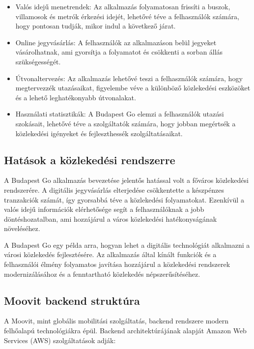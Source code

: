 \begin{itemize} \item Valós idejű menetrendek: Az alkalmazás folyamatosan frissíti a buszok, villamosok és metrók érkezési idejét, lehetővé téve a felhasználók számára, hogy pontosan tudják, mikor indul a következő járat. \item Online jegyvásárlás: A felhasználók az alkalmazáson belül jegyeket vásárolhatnak, ami gyorsítja a folyamatot és csökkenti a sorban állás szükségességét. \item Útvonaltervezés: Az alkalmazás lehetővé teszi a felhasználók számára, hogy megtervezzék utazásaikat, figyelembe véve a különböző közlekedési eszközöket és a lehető leghatékonyabb útvonalakat. \item Használati statisztikák: A Budapest Go elemzi a felhasználók utazási szokásait, lehetővé téve a szolgáltatók számára, hogy jobban megértsék a közlekedési igényeket és fejleszthessék szolgáltatásaikat. \end{itemize}

\subsection{Hatások a közlekedési rendszerre}

A Budapest Go alkalmazás bevezetése jelentős hatással volt a főváros közlekedési rendszerére. A digitális jegyvásárlás elterjedése csökkentette a készpénzes tranzakciók számát, így gyorsabbá téve a közlekedési folyamatokat. Ezenkívül a valós idejű információk elérhetősége segít a felhasználóknak a jobb döntéshozatalban, ami hozzájárul a város közlekedési hatékonyságának növeléséhez.

A Budapest Go egy példa arra, hogyan lehet a digitális technológiát alkalmazni a városi közlekedés fejlesztésére. Az alkalmazás által kínált funkciók és a felhasználói élmény folyamatos javítása hozzájárul a közlekedési rendszerek modernizálásához és a fenntartható közlekedés népszerűsítéséhez.

\subsection{Moovit backend struktúra}

A Moovit, mint globális mobilitási szolgáltatás, backend rendszere modern felhőalapú technológiákra épül. Backend architektúrájának alapját Amazon Web Services (AWS) szolgáltatások adják:

